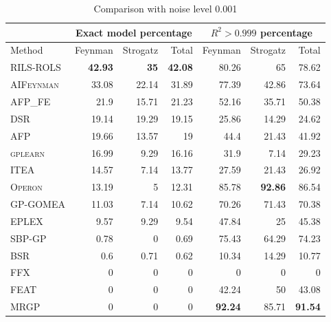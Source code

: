 \documentclass[a4paper,12pt]{elsarticle}
\begin{document}
\begin{table}[!htb]
	\caption{Comparison with noise level 0.001}\label{tab:comp_noise0001}
	\centering
	\begin{tabular}{l|rrr|rrr} \hline
		& \multicolumn{3}{c|}{Exact model percentage} & \multicolumn{3}{c}{$R^2 > 0.999$ percentage}\\ \hline
		Method & Feynman & Strogatz & Total & Feynman & Strogatz & Total \\ \hline
		\textsc{RILS-ROLS}&\bf{42.93}&\bf{35}&\bf{42.08}&80.26&65&78.62\\
		\textsc{AIFeynman}&33.08&22.14&31.89&77.39&42.86&73.64\\
		\textsc{AFP\_FE}&21.9&15.71&21.23&52.16&35.71&50.38\\
		\textsc{DSR}&19.14&19.29&19.15&25.86&14.29&24.62\\
		\textsc{AFP}&19.66&13.57&19&44.4&21.43&41.92\\
		\textsc{gplearn}&16.99&9.29&16.16&31.9&7.14&29.23\\
		\textsc{ITEA}&14.57&7.14&13.77&27.59&21.43&26.92\\
		\textsc{Operon}&13.19&5&12.31&85.78&\bf{92.86}&86.54\\
		\textsc{GP-GOMEA}&11.03&7.14&10.62&70.26&71.43&70.38\\
		\textsc{EPLEX}&9.57&9.29&9.54&47.84&25&45.38\\
		\textsc{SBP-GP}&0.78&0&0.69&75.43&64.29&74.23\\
		\textsc{BSR}&0.6&0.71&0.62&10.34&14.29&10.77\\
		\textsc{FFX}&0&0&0&0&0&0\\
		\textsc{FEAT}&0&0&0&42.24&50&43.08\\
		\textsc{MRGP}&0&0&0&\bf{92.24}&85.71&\bf{91.54}\\
		\hline
	\end{tabular}
\end{table}
\end{document}
